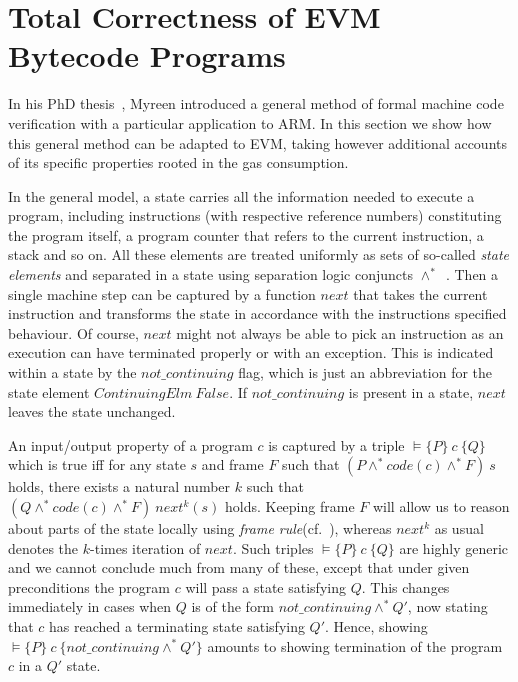 \documentclass[sigplan,10pt,review]{acmart}\settopmatter{printfolios=true,printccs=false,printacmref=false}
\newcommand{\sconj}{\wedge^*}
\newcommand{\pvalid}[3]{\models\{#1\}\:#2\:\{#3\}}
\newcommand{\xnext}{\mathit{next}}
\newcommand{\code}[1]{\mathit{code}(#1)}
\newcommand{\ncont}{\mathit{not\_continuing}}
\begin{document}
\section{Total Correctness of EVM Bytecode Programs}
\label{sec:corr}
In his PhD thesis~\cite{DBLP:phd/ethos/Myreen09}, Myreen introduced a general 
method of formal 
machine code verification with a particular application to ARM. In this section we show how
this general method can be adapted to EVM, taking however additional accounts of its specific properties rooted in the 
gas consumption.
 
In the general model, a state carries all the information needed to execute a program, including
instructions (with respective reference numbers) constituting the program itself, a program counter that
refers to the current instruction, a stack and so on. All these elements are treated uniformly 
as sets of so-called \emph{state elements}
and separated in a state using separation logic conjuncts $\sconj$~\cite{Reynolds_02}.  
Then a single machine step can be captured by a function $\xnext$ that 
takes the current instruction and transforms the state in accordance with the instructions
specified behaviour. Of course, $\xnext$ might not always be able to pick an instruction
as an execution can have terminated properly or with an exception. This is indicated within a state
by the $\ncont$ flag, which is just an abbreviation for the state element 
$\mathit{ContinuingElm}\:False$. If $\ncont$ is present in a state, $\xnext$
leaves the state unchanged.   
   
An input/output property of a program $c$ is captured by a triple
$\pvalid{P}{c}{Q}$ which is true iff for any state $s$ and frame $F$ such that
$(P \sconj \code{c} \sconj F)\: s$ holds, there exists a natural number $k$ such that 
$(Q \sconj \code{c} \sconj F)\: \xnext^k(s)$ holds. 
Keeping frame $F$ will allow us to reason about parts of the state locally using \emph{frame rule}(cf.~\cite{Reynolds_02}),
whereas $\xnext^k$ as usual denotes the $k$-times iteration of $\xnext$.
Such triples $\pvalid{P}{c}{Q}$ are highly generic and we cannot conclude much from many of these, except that
under given preconditions the program $c$ will pass a state satisfying $Q$. This changes immediately in cases when $Q$ is of
the form $\ncont \sconj Q'$, now stating that $c$ has reached a terminating state satisfying $Q'$.
Hence, showing $\pvalid{P}{c}{\ncont \sconj Q'}$ amounts to showing termination of the program $c$ in
a $Q'$ state.
\end{document}
